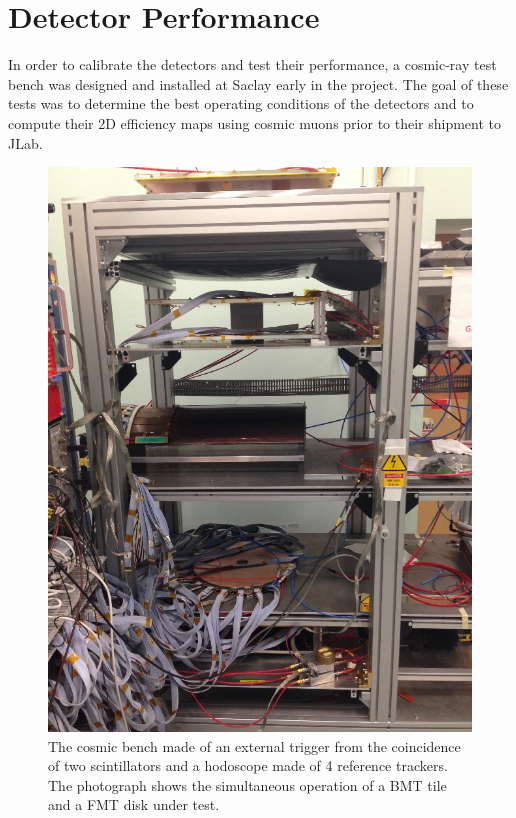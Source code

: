 \section{Detector Performance}

In order to calibrate the detectors and test their performance, a cosmic-ray test bench was designed and installed at Saclay
early in the project. The goal of these tests was to determine the best operating conditions
of the detectors and to compute their 2D efficiency maps using cosmic muons prior to their shipment to JLab.

\begin{figure}[htb]
 \includegraphics[width=1.0\columnwidth,keepaspectratio]{images/banc_cosmique}
 \caption{The cosmic bench made of an external trigger from the coincidence of two scintillators and a hodoscope made of 4 
reference trackers. The photograph shows the simultaneous operation of a BMT tile and a FMT disk under test.}
 \label{fig:mm-testbench}
\end{figure}

